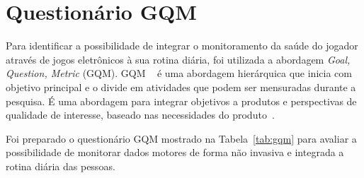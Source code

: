 \chapter{Questionário GQM}\label{apend:gqm}
Para identificar a possibilidade de integrar o monitoramento da saúde do jogador através de jogos eletrônicos à sua rotina diária, foi utilizada a abordagem \textit{Goal, Question, Metric} (GQM). GQM ~\cite{basili94} é uma abordagem hierárquica que inicia com objetivo principal e o divide em atividades que podem ser mensuradas durante a pesquisa. É uma abordagem para integrar objetivos a produtos e perspectivas de qualidade de interesse, baseado nas necessidades do produto~\cite{van1999goal}. 

Foi preparado o questionário GQM mostrado na Tabela~\ref{tab:gqm} para avaliar a possibilidade de monitorar dados motores de forma não invasiva e integrada a rotina diária das pessoas.

